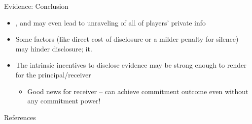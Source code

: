\documentclass[english,10pt
,aspectratio=169
]{beamer}
\begin{document}
\begin{frame}{Evidence: Conclusion}
\begin{itemize}
	\item {}, and may even lead to unraveling of all of players' private info
	\item Some factors (like direct cost of disclosure or a milder penalty for silence) may \alert{hinder disclosure};  it.
	\item The intrinsic incentives to disclose evidence may be strong enough to render  for the principal/receiver
	\begin{itemize}
		\item Good news for receiver -- can achieve commitment outcome even without any commitment power!
	\end{itemize}
\end{itemize}
\end{frame}


\appendix
\begin{frame}[allowframebreaks]{References}


\end{frame}
\end{document}
